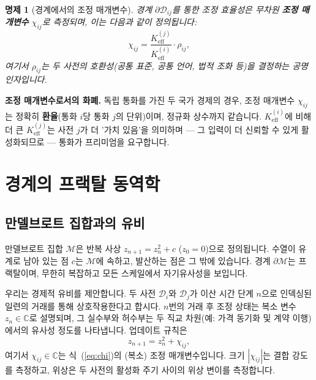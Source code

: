\documentclass[12pt,a4paper]{article}
\newtheorem{proposition}[theorem]{명제}
\theoremstyle{remark}
\begin{document}
	\begin{proposition}[경계에서의 조정 매개변수]
		경계 \(\partial\mathcal{D}_{ij}\)를 통한 조정 효율성은 무차원 \textbf{조정 매개변수} \(\chi_{ij}\)로 측정되며, 이는 다음과 같이 정의됩니다:
		\begin{equation}
			\chi_{ij} = \frac{K_{\mathrm{eff}}^{(j)}}{K_{\mathrm{eff}}^{(i)}} \cdot \rho_{ij},
			\label{eq:chi}
		\end{equation}
		여기서 \(\rho_{ij}\)는 두 사전의 호환성(공통 표준, 공통 언어, 법적 조화 등)을 결정하는 공명 인자입니다.
	\end{proposition}
	
	\textbf{조정 매개변수로서의 화폐.} 독립 통화를 가진 두 국가 경제의 경우, 조정 매개변수 \(\chi_{ij}\)는 정확히 \textbf{환율}(통화 \(i\)당 통화 \(j\)의 단위)이며, 정규화 상수까지 같습니다. \(K_{\mathrm{eff}}^{(i)}\)에 비해 더 큰 \(K_{\mathrm{eff}}^{(j)}\)는 사전 \(j\)가 더 '가치 있음'을 의미하며 — 그 입력이 더 신뢰할 수 있게 활성화되므로 — 통화가 프리미엄을 요구합니다.
	
	\section{경계의 프랙탈 동역학}
	
	\subsection{만델브로트 집합과의 유비}
	
	만델브로트 집합 \(\mathcal{M}\)은 반복 사상 \(z_{n+1} = z_n^2 + c\) (\(z_0 = 0\))으로 정의됩니다. 수열이 유계로 남아 있는 점 \(c\)는 \(\mathcal{M}\)에 속하고, 발산하는 점은 그 밖에 있습니다. 경계 \(\partial\mathcal{M}\)는 프랙탈이며, 무한히 복잡하고 모든 스케일에서 자기유사성을 보입니다.
	
	우리는 경제적 유비를 제안합니다. 두 사전 \(\mathcal{D}_i\)와 \(\mathcal{D}_j\)가 이산 시간 단계 \(n\)으로 인덱싱된 일련의 거래를 통해 상호작용한다고 합시다. \(n\)번의 거래 후 조정 상태는 복소 변수 \(z_n \in \mathbb{C}\)로 설명되며, 그 실수부와 허수부는 두 직교 차원(예: 가격 동기화 및 계약 이행)에서의 유사성 정도를 나타냅니다. 업데이트 규칙은
	\begin{equation}
		z_{n+1} = z_n^2 + \chi_{ij},
		\label{eq:mandel_econ}
	\end{equation}
	여기서 \(\chi_{ij} \in \mathbb{C}\)는 식~(\ref{eq:chi})의 (복소) 조정 매개변수입니다. 크기 \(|\chi_{ij}|\)는 결합 강도를 측정하고, 위상은 두 사전의 활성화 주기 사이의 위상 변이를 측정합니다.
	
\end{document}
